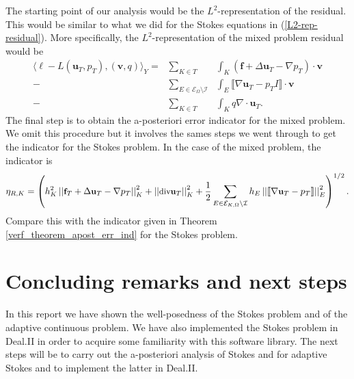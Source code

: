 \documentclass[12pt,a4paper]{article}
\theoremstyle{definition}
\begin{document}
The starting point of our analysis would be the $L^2$-representation of the residual.  This would be similar to what we did for the Stokes equations in (\ref{L2-rep-residual}).   More specifically, the $L^2$-representation of the mixed problem residual would be
\begin{eqnarray}\label{L2-rep-residual-mixed}
\langle \ell -L\left(\textbf{u}_T,p_T\right),\left(\textbf{v},q\right) \rangle_Y= &\sum_{K\in T}&\int_{K}\left(\textbf{f}+\Delta \textbf{u}_T-\nabla p_T\right)\cdot \textbf{v}\nonumber\\-&\sum_{E\in \mathcal{E}_{\Omega}\setminus\mathcal{I}}&\int_{E}\llbracket\nabla \textbf{u}_T-p_TI\rrbracket \cdot \textbf{v}\\
-&\sum_{K\in T}&\int_{K}q \nabla \cdot \textbf{u}_T. \nonumber
\end{eqnarray}
The final step is to obtain the a-posteriori error indicator for the mixed problem.  We omit this procedure but it involves the sames steps we went through to get the indicator for the Stokes problem.  In the case of the mixed problem, the indicator is
\begin{equation}\small
\eta_{R,K}=\left(h^2_K\left|\left|\textbf{f}_T+\Delta \textbf{u}_T-\nabla p_T\right|\right|^2_K+\left|\left|\text{div} \textbf{u}_T\right|\right|^2_K+\frac{1}{2}\sum_{E\in\mathcal{E}_{K,\Omega}\setminus\mathcal{I}}h_E\left|\left| \llbracket \nabla \textbf{u}_T -p_T \rrbracket \right|\right|_E^2\right)^{1/2}.
\end{equation}
Compare this with the indicator given in Theorem \ref{verf_theorem_apost_err_ind} for the Stokes problem.
\section{Concluding remarks and next steps}\label{sec_conclusion}
In this report we have shown the well-posedness of the Stokes problem and of the adaptive continuous problem.  We have also implemented the Stokes problem in Deal.II in order to acquire some familiarity with this software library.  The next steps will be to carry out the a-posteriori analysis of Stokes and for adaptive Stokes and to implement the latter  in Deal.II.  



\end{document}
